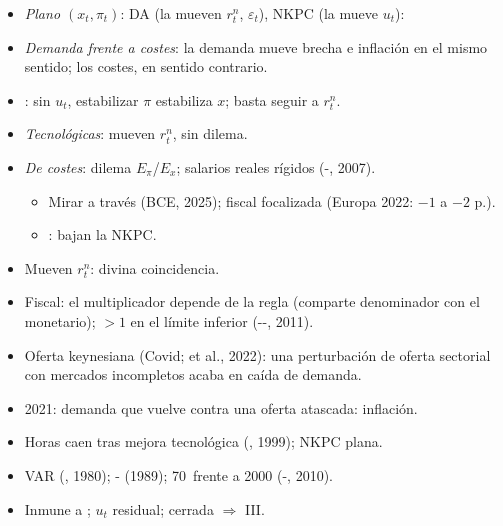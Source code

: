 \documentclass{article}
\begin{document}
\begin{columnas}
\begin{itemize}
\item \emph{Plano $(x_t,\pi_t)$}: DA (la mueven $r^n_t$, $\varepsilon_t$), NKPC (la mueve $u_t$):
\end{itemize}
\begin{itemize}
\item \emph{Demanda frente a costes}: la demanda mueve brecha e inflación en el mismo sentido; los costes, en sentido contrario.
\item {}: sin $u_t$, estabilizar $\pi$ estabiliza $x$; basta seguir a $r^n_t$.
\item \emph{Tecnológicas}: mueven $r^n_t$, sin dilema.
\item \emph{De costes}: dilema $E_\pi$/$E_x$; salarios reales rígidos (-, 2007).
  \begin{itemize}
  \item Mirar a través (BCE, 2025); fiscal focalizada (Europa 2022: $-1$ a $-2$ p.).
  \item {}: bajan la NKPC.
  \end{itemize}
\end{itemize}
\begin{itemize}
\item Mueven $r^n_t$: divina coincidencia.
\item Fiscal: el multiplicador depende de la regla (comparte denominador con el monetario); $>1$ en el límite inferior (--, 2011).
\item Oferta keynesiana (Covid;  et al., 2022): una perturbación de oferta sectorial con mercados incompletos acaba en caída de demanda.
\item 2021: demanda que vuelve contra una oferta atascada: inflación.
\end{itemize}
\begin{itemize}
\item Horas caen tras mejora tecnológica (, 1999); NKPC plana.
\item VAR (, 1980); - (1989); 70~frente a 2000 (-, 2010).
\item Inmune a ; $u_t$ residual; cerrada $\Rightarrow$ III.
\end{itemize}


\end{columnas}
\end{document}
